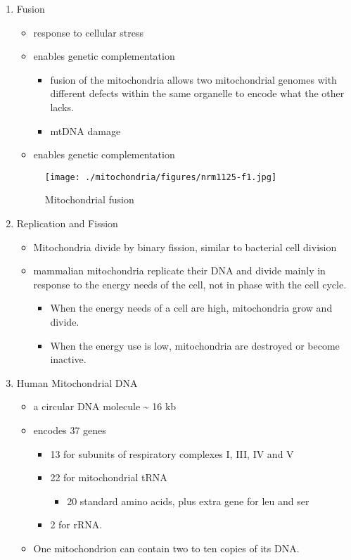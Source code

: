 \documentclass{scrartcl}
\begin{document}
\begin{enumerate}
\item Fusion
\label{sec:orge38c4b1}
\begin{itemize}
\item response to cellular stress
\item enables genetic complementation
\begin{itemize}
\item fusion of the mitochondria allows two mitochondrial genomes with
different defects within the same organelle to encode what the
other lacks.
\item mtDNA damage
\end{itemize}
\item enables genetic complementation
\end{itemize}


\begin{figure}[htbp]
\centering
\texttt{[image: ./mitochondria/figures/nrm1125-f1.jpg]}
\caption[fusion]{\label{fig:org33a0abf}
Mitochondrial fusion}
\end{figure}

\item Replication and Fission
\label{sec:org953a43c}

\begin{itemize}
\item Mitochondria divide by binary fission, similar to bacterial cell division

\item mammalian mitochondria replicate their DNA and divide mainly in response
to the energy needs of the cell, not in phase with the cell cycle.
\begin{itemize}
\item When the energy needs of a cell are high, mitochondria grow and
divide.
\item When the energy use is low, mitochondria are destroyed
or become inactive.
\end{itemize}
\end{itemize}

\item Human Mitochondrial DNA
\label{sec:org5ef99b0}
\begin{itemize}
\item a circular DNA molecule \textasciitilde{} 16 kb
\item encodes 37 genes
\begin{itemize}
\item 13 for subunits of respiratory complexes I, III, IV and V
\item 22 for mitochondrial tRNA
\begin{itemize}
\item 20 standard amino acids, plus extra gene for leu and ser
\end{itemize}
\item 2 for rRNA.
\end{itemize}
\item One mitochondrion can contain two to ten copies of its DNA.
\end{itemize}


\end{enumerate}
\end{document}
